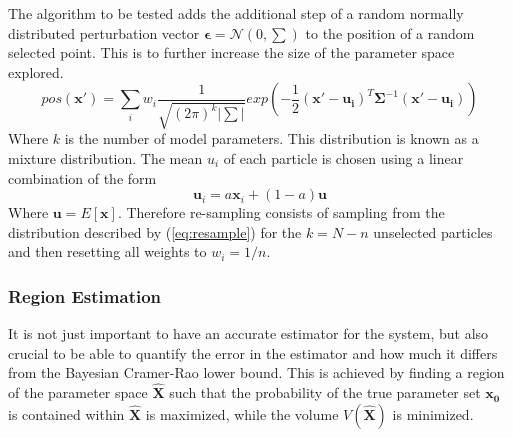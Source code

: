 The algorithm to be tested adds the additional step of a random normally distributed perturbation vector $\mathbf{\epsilon}= \mathcal{N}(0,\sum \limits)$ to the position of a random selected point. This is to further increase the size of the parameter space explored.\cite{hamiltonian_learning}
\begin{equation}
pos(\mathbf{x'}) = \sum \limits_i w_i \frac{1}{\sqrt{(2\pi)^k|\sum|}}exp\left(-\frac{1}{2}(\mathbf{x'}-\mathbf{u_i})^T\mathbf{\Sigma}^{-1}(\mathbf{x'}-\mathbf{u_i})\right)
\label{eq:resample}
\end{equation}
Where $k$ is the number of model parameters. This distribution is known as a mixture distribution. The mean $u_i$ of each particle is chosen using a linear combination of the form 
\begin{equation}
\mathbf{u}_i = a\mathbf{x}_i + (1-a)\mathbf{u}
\end{equation}
Where $\mathbf{u}= E[\mathbf{x}]$. Therefore re-sampling consists of sampling from the distribution described by (\ref{eq:resample}) for the $k=N-n$ unselected particles and then resetting all weights to $w_i = 1/n$.  
\subsubsection{Region Estimation}
\label{sec:regionestimation}
It is not just important to have an accurate estimator for the system, but also crucial to be able to quantify the error in the estimator and how much it differs from the  Bayesian Cramer-Rao lower bound. This is achieved by finding a region of the parameter space $\mathbf{\hat{X}}$ such that the probability of the true parameter set $\mathbf{x_0}$ is contained within $\mathbf{\hat{X}}$ is maximized, while the volume $V(\mathbf{\hat{X}})$ is minimized.\cite{hamiltonian_learning}

